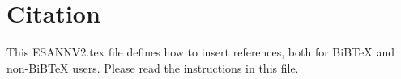 \documentclass{style/esannV2}
\begin{document}



\section{Citation}
This ESANNV2.tex file defines how to insert references, both for
BiBTeX and non-BiBTeX users.  Please read the instructions in this
file. \cite{Antos2008}


\begin{footnotesize}

% 
% 
% 
% 
% 





\end{footnotesize}

\end{document}
